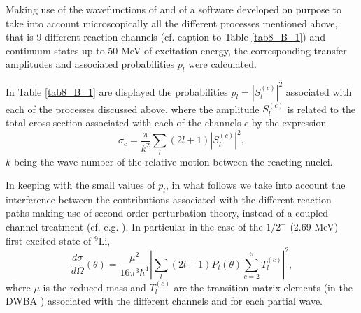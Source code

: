 \begin{subappendices}
Making use of the wavefunctions of  \cite{Barranco:01} and of a software developed on purpose to take into account microscopically all the different processes mentioned above, that is 9 different reaction channels (cf. caption to Table \ref{tab8_B_1}) and continuum states up to 50 MeV of excitation energy, the corresponding transfer amplitudes and associated probabilities $p_l$ were calculated.


 In Table \ref{tab8_B_1} are displayed the probabilities $p_l=|S_l^{(c)}|^2$ associated with each of the processes discussed above, where the amplitude $S_l^{(c)}$ is related to the total cross section associated with each of the channels $c$  by the expression \citep{Satchler:80,Landau:81}
\begin{equation}\label{eq6}
    \sigma_c=\frac{\pi}{k^2}\sum_l(2l+1)|S_l^{(c)}|^2,
\end{equation}
$k$ being the wave number of the relative motion between the reacting nuclei.



 In keeping with the small values of $p_l$, in what follows we take into account the interference between the contributions associated with the different reaction paths making use of second order perturbation theory, instead of a coupled channel treatment (cf. e.g.  \cite{Ascuitto:69} \cite{Tamura:70} \cite{Khoa:04} \cite{Keeley:07b} \cite{Thompson:88}). In particular in the case of the $1/2^-$ (2.69 MeV) first excited state of $^9$Li,
\begin{equation}
    \frac{d\sigma}{d\Omega}(\theta)=\frac{\mu^2}{16\pi^3\hbar^4}\left|\sum_l(2l+1)P_l(\theta)\sum_{c=2}^5 T^{(c)}_l\right|^2,
\end{equation}
where $\mu$ is the reduced mass and $T^{(c)}_l$ are the transition matrix elements (in the DWBA \cite{Satchler:80}) associated with the different channels and for each partial wave.


\end{subappendices}
